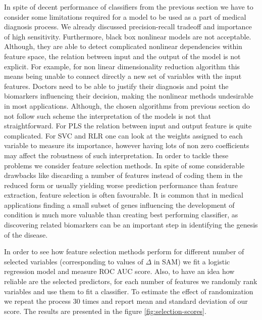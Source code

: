 \documentclass[shortabstract, english, mgr]{iithesis}
\begin{document}
In spite of decent performance of classifiers from the previous section we have to consider some limitations required for a model to be used as a part of medical diagnosis process. We already discussed precision-recall tradeoff and importance of high sensitivity. Furthermore, black box nonlinear models are not acceptable. Although, they are able to detect complicated nonlinear dependencies within feature space, the relation between input and the output of the model is not explicit. For example, for non linear dimensionality reduction algorithm this means being unable to connect directly a new set of variables with the input features. Doctors need to be able to justify their diagnosis and point the biomarkers influencing their decision, making the nonlinear methods undesirable in most applications. Although, the chosen algorithms from previous section do not follow such scheme the interpretation of the models is not that straightforward. For PLS the relation between input and output feature is quite complicated. For SVC and RLR one can look at the weights assigned to each variable to measure its importance, however having lots of non zero coefficients may affect the robustness of such interpretation. In order to tackle these problems we consider feature selection methods. In spite of some considerable drawbacks like discarding a number of features instead of coding them in the reduced form or usually yielding worse prediction performance than feature extraction, feature selection is often favourable. It is common that in medical applications finding a small subset of genes influencing the development of condition is much more valuable than creating best performing classifier, as discovering related biomarkers can be an important step in identifying the genesis of the disease.

In order to see how feature selection methods perform for different number of selected variables (corresponding to values of $\Delta$ in SAM) we fit a logistic regression model and measure ROC AUC score. Also, to have an idea how reliable are the selected predictors, for each number of features we randomly rank variables and use them to fit a classifier. To estimate the effect of randomization we repeat the process $30$ times and report mean and standard deviation of our score. The results are presented in the figure \ref{fig:selection-scores}.
\end{document}
